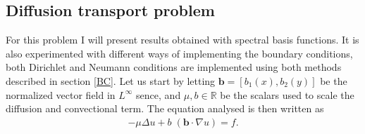 \subsection{Diffusion transport problem}

For this problem I will present results obtained with spectral basis functions. It is also experimented with different ways of implementing the boundary conditions, both Dirichlet and Neumann conditions are implemented using both methods described in section \ref{BC}.
Let us start by letting $\mathbf{b} = [b_1(x),b_2(y)] $ be the normalized vector field in $L^{\infty}$ sence, and  $\mu,b \in \mathbb{R}$ be the scalars used to scale the diffusion and convectional term. The equation analysed is then written as 
\begin{align}
	-\mu \Delta u + b \; (\mathbf{b} \cdot \nabla u) = f .
	\label{eq:difftransForConditionNumberPlotting}
\end{align}
%
